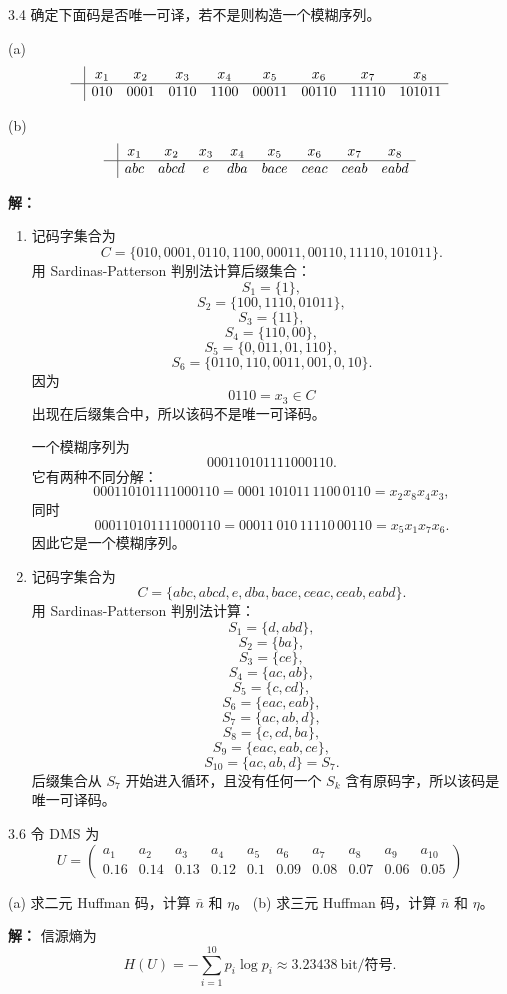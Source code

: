 \documentclass[UTF8,11pt,a4paper]{ctexart}
\begin{document}
\begin{problem}{3.4}
确定下面码是否唯一可译，若不是则构造一个模糊序列。

(a)
\[
\begin{array}{c|cccccccc}
& x_1 & x_2 & x_3 & x_4 & x_5 & x_6 & x_7 & x_8\\ \hline
& 010 & 0001 & 0110 & 1100 & 00011 & 00110 & 11110 & 101011
\end{array}
\]

(b)
\[
\begin{array}{c|cccccccc}
& x_1 & x_2 & x_3 & x_4 & x_5 & x_6 & x_7 & x_8\\ \hline
& abc & abcd & e & dba & bace & ceac & ceab & eabd
\end{array}
\]
\end{problem}
\noindent\textbf{解：}
\begin{enumerate}[label=\textnormal{(\alph*)}]
  \item 记码字集合为
  \[
  C=\{010,0001,0110,1100,00011,00110,11110,101011\}.
  \]
  用 Sardinas-Patterson 判别法计算后缀集合：
  \[
  S_1=\{1\},
  \]
  \[
  S_2=\{100,1110,01011\},
  \]
  \[
  S_3=\{11\},
  \]
  \[
  S_4=\{110,00\},
  \]
  \[
  S_5=\{0,011,01,110\},
  \]
  \[
  S_6=\{0110,110,0011,001,0,10\}.
  \]
  因为
  \[
  0110=x_3\in C
  \]
  出现在后缀集合中，所以该码不是唯一可译码。

  一个模糊序列为
  \[
  000110101111000110.
  \]
  它有两种不同分解：
  \[
  000110101111000110
  =0001\,101011\,1100\,0110
  =x_2x_8x_4x_3,
  \]
  同时
  \[
  000110101111000110
  =00011\,010\,11110\,00110
  =x_5x_1x_7x_6.
  \]
  因此它是一个模糊序列。

  \item 记码字集合为
  \[
  C=\{abc,abcd,e,dba,bace,ceac,ceab,eabd\}.
  \]
  用 Sardinas-Patterson 判别法计算：
  \[
  S_1=\{d,abd\},
  \]
  \[
  S_2=\{ba\},
  \]
  \[
  S_3=\{ce\},
  \]
  \[
  S_4=\{ac,ab\},
  \]
  \[
  S_5=\{c,cd\},
  \]
  \[
  S_6=\{eac,eab\},
  \]
  \[
  S_7=\{ac,ab,d\},
  \]
  \[
  S_8=\{c,cd,ba\},
  \]
  \[
  S_9=\{eac,eab,ce\},
  \]
  \[
  S_{10}=\{ac,ab,d\}=S_7.
  \]
  后缀集合从 $S_7$ 开始进入循环，且没有任何一个 $S_k$ 含有原码字，所以该码是唯一可译码。
\end{enumerate}
\vspace{0.8em}

\begin{problem}{3.6}
令 DMS 为
\[
U = \begin{pmatrix}
a_1 & a_2 & a_3 & a_4 & a_5 & a_6 & a_7 & a_8 & a_9 & a_{10} \\
0.16 & 0.14 & 0.13 & 0.12 & 0.1 & 0.09 & 0.08 & 0.07 & 0.06 & 0.05
\end{pmatrix}
\]

(a) 求二元 Huffman 码，计算 \(\bar{n}\) 和 \(\eta\)。
(b) 求三元 Huffman 码，计算 \(\bar{n}\) 和 \(\eta\)。
\end{problem}
\noindent\textbf{解：}
信源熵为
\[
H(U)=-\sum_{i=1}^{10}p_i\log p_i\approx 3.23438\ \text{bit/符号}.
\]
\end{document}
